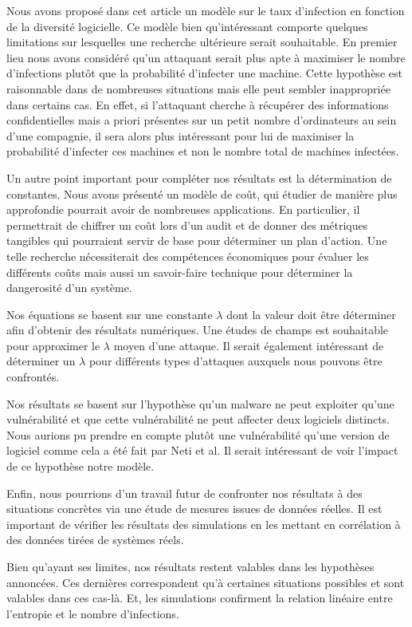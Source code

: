 Nous avons proposé dans cet article un modèle sur le taux d'infection en fonction de la diversité logicielle. Ce modèle bien
qu'intéressant comporte quelques limitations sur lesquelles une recherche ultérieure serait souhaitable. En premier lieu nous avons
considéré qu'un attaquant serait plus apte à maximiser le nombre d'infections plutôt que la probabilité d'infecter une machine.
Cette hypothèse est raisonnable dans de nombreuses situations mais elle peut sembler inappropriée dans certains cas. En effet, si
l'attaquant
cherche à récupérer des informations confidentielles mais a priori présentes sur un petit nombre d'ordinateurs au sein d'une
compagnie, il sera alors plus intéressant pour lui de maximiser la probabilité d'infecter ces machines et non le nombre total de machines infectées.
\newline

Un autre point important pour compléter nos résultats est la détermination de constantes. Nous avons présenté un
modèle de coût, qui étudier de manière plus approfondie pourrait avoir de nombreuses applications. En particulier, il permettrait de chiffrer un
coût lors d'un audit et de donner des métriques tangibles qui pourraient servir de base pour déterminer un plan
d'action. Une telle recherche nécessiterait des compétences économiques pour évaluer les différents coûts mais aussi un
savoir-faire technique pour déterminer la dangerosité d'un système.
\newline

Nos équations se basent sur une constante $\lambda$ dont la valeur doit être déterminer afin d'obtenir des résultats numériques. Une
études de champs est souhaitable pour approximer le $\lambda$ moyen d'une attaque. Il serait également intéressant de déterminer un
$\lambda$ pour différents types d'attaques auxquels nous pouvons être confrontés.
\newline

Nos résultats se basent sur l'hypothèse qu'un malware ne peut exploiter qu'une vulnérabilité et que cette vulnérabilité
ne peut affecter deux logiciels distincts. Nous aurions pu prendre en compte plutôt une vulnérabilité qu’une version de logiciel comme cela a été fait par  Neti et al.\cite{softwareDiversity:Security}
 Il serait intéressant de voir l'impact de ce hypothèse notre modèle.

Enfin, nous pourrions d'un travail futur de confronter nos résultats à des situations concrètes via une étude de mesures issues de
données réelles. Il est important de vérifier les résultats des simulations en les mettant en corrélation à des données tirées de systèmes réels. 
\newline

Bien qu'ayant ses limites, nos résultats restent valables dans les hypothèses annoncées. Ces dernières correspondent
qu'à certaines situations possibles et sont valables dans ces cas-là. Et, les simulations confirment la relation
linéaire entre l'entropie et le nombre d'infections. 
